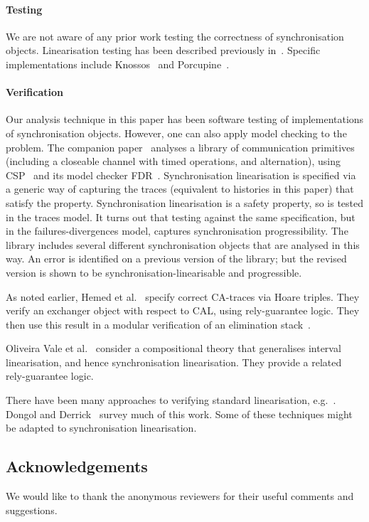 
\paragraph{Testing}

We are not aware of any prior work testing the correctness of synchronisation
objects.  
%
Linearisation testing has been described previously
in~\cite{wing-gong,gavin:lin-testing}.  Specific implementations include
Knossos~\cite{knossos} and Porcupine~\cite{porcupine}.



\paragraph{Verification}

Our analysis technique in this paper has been software testing of
implementations of synchronisation objects.  However, one can also apply model
checking to the problem.  The companion paper~\cite{gavin:SCL-CSP} analyses a
library of communication primitives (including a closeable channel with timed
operations, and alternation), using CSP~\cite{awr:ucs} and its model checker
FDR~\cite{fdr3}.  Synchronisation linearisation is specified via a
generic way of capturing the traces (equivalent to histories in this paper)
that satisfy the property.  Synchronisation linearisation is a safety
property, so is tested in the traces model.  It turns out that testing against
the same specification, but in the failures-divergences model, captures
synchronisation progressibility.  The library includes several different
synchronisation objects that are analysed in this way.
An error is identified on a previous version of the library;
but the revised version is shown to be synchronisation-linearisable and
progressible.

As noted earlier, Hemed et al.~\cite{HRV-2015} specify correct CA-traces via
Hoare triples.  They verify an exchanger object with respect to CAL, using
rely-guarantee logic.  They then use this result in a modular verification of
an elimination stack~\cite{HSY-2004}.

Oliveira Vale et al.~\cite{VSC23} consider a compositional theory that
generalises interval linearisation, and hence synchronisation linearisation.
They provide a related rely-guarantee logic.

There have been many approaches to verifying standard linearisation,
e.g.~\cite{HSV13, CHSV2015, DHK15, BEEH18, AHHJR, lincheck}.  Dongol and
Derrick~\cite{dongol-derrick} survey much of this work.  Some of these
techniques might be adapted to synchronisation linearisation.


\subsection*{Acknowledgements}

We would like to thank the anonymous reviewers for their useful comments and
suggestions. 


%


